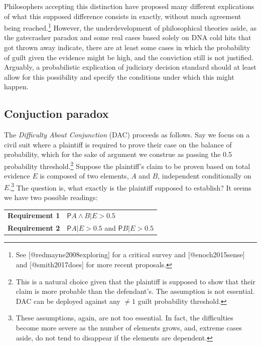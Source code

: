 \documentclass[10pt,dvipsnames,enabledeprecatedfontcommands]{scrartcl}
\newcommand{\et}{\wedge}
\newcommand{\pr}{\mathsf{P}}
\begin{document}
Philosophers accepting this distinction have proposed many different
explications of what this supposed difference consists in exactly,
without much agreement being
reached.\footnote{See [@redmayne2008exploring] for a critical survey and [@enoch2015sense] and [@smith2017does] for more recent proposals.}
However, the underdevelopment of philosophical theories aside, as the
gatecrasher paradox and some real cases based solely on DNA cold hits
that got thrown away indicate, there are at least some cases in which
the probability of guilt given the evidence might be high, and the
conviction still is not justified. Arguably, a probabilistic explication
of judiciary decision standard should at least allow for this
possibility and specify the conditions under which this might happen.

\subsection{Conjuction paradox}\label{conjuction-paradox}

The \emph{Difficulty About Conjunction} (DAC) proceeds as follows. Say
we focus on a civil suit where a plaintiff is required to prove their
case on the balance of probability, which for the sake of argument we
construe as passing the 0.5 probability
threshold.\footnote{This is a natural choice given that the plaintiff is supposed to show that their claim is more probable than the defendant's. The assumption is not essential. DAC can be deployed against any $\neq 1$ guilt probability threshold.}
Suppose the plaintiff's claim to be proven based on total evidence \(E\)
is composed of two elements, \(A\) and \(B\), independent conditionally
on
\(E\).\footnote{These assumptions, again, are not  too essential. In fact, the difficulties become more severe as the number of elements grows, and, extreme cases aside, do not tend to disappear if the elements are dependent.}
The question is, what exactly is the plaintiff supposed to establish? It
seems we have two possible readings:

\begin{center}
\begin{tabular}
{@{}ll@{}}
\toprule
\textbf{Requirement 1}  &    $\pr{A\et B\vert E}>0.5$ \\ 
\textbf{Requirement 2} &    $\pr{A\vert E}>0.5$ and $\pr{B\vert E}>0.5$\\   
\bottomrule
\end{tabular}
\end{center}
\end{document}
